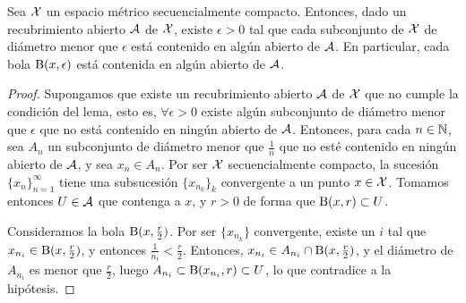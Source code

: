 \begin{lem}[Lebesgue]
\label{comp_lema_lebesgue}
Sea $\mathcal{X}$ un espacio métrico secuencialmente compacto. Entonces, dado un recubrimiento abierto $\mathcal{A}$ de $\mathcal{X}$, existe $\epsilon>0$ tal que cada subconjunto de $\mathcal{X}$ de diámetro menor que $\epsilon$ está contenido en algún abierto de $\mathcal{A}$. En particular, cada bola $\operatorname{B}(x,\epsilon)$ está contenida en algún abierto de $\mathcal{A}$.

\begin{proof}
Supongamos que existe un recubrimiento abierto $\mathcal{A}$ de $\mathcal{X}$ que no cumple la condición del lema, esto es, $\forall\epsilon > 0$ existe algún subconjunto de diámetro menor que $\epsilon$ que no está contenido en ningún abierto de $\mathcal{A}$. Entonces, para cada $n\in\mathbb{N}$, sea $A_n$ un subconjunto de diámetro menor que $\frac{1}{n}$ que no esté contenido en ningún abierto de $\mathcal{A}$, y sea $x_n\in A_n$. Por ser $\mathcal{X}$ secuencialmente compacto, la sucesión $\{x_n\}_{n=1}^\infty$ tiene una subsucesión $\{x_{n_k}\}_k$ convergente a un punto $x\in\mathcal{X}$. Tomamos entonces $U\in\mathcal{A}$ que contenga a $x$, y $r>0$ de forma que $\operatorname{B}(x,r)\subset U$.

Consideramos la bola $\operatorname{B}(x,\frac{r}{2})$. Por ser $\{x_{n_k}\}$ convergente, existe un $i$ tal que $x_{n_i}\in\operatorname{B}(x,\frac{r}{2})$, y entonces $\frac{1}{n_i}<\frac{r}{2}$. Entonces, $x_{n_i}\in A_{n_i}\cap\operatorname{B}(x,\frac{r}{2})$, y el diámetro de $A_{n_i}$ es menor que $\frac{r}{2}$, luego $A_{n_i}\subset\operatorname{B}(x_{n_i},r)\subset U$, lo que contradice a la hipótesis.
\end{proof}
\end{lem}